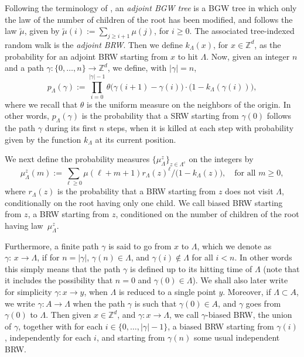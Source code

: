 \documentclass[11pt]{article}
\numberwithin{equation}{section}
\theoremstyle{plain}
\theoremstyle{definition}
\newcommand{\1}{{\text{\Large $\mathfrak 1$}}}
\begin{document}
Following the terminology of \cite{Zhu1,Zhu3}, an
{\it adjoint BGW tree} is a BGW tree in which only the law
of the number of children of
the root has been modified, and follows the law $\tilde \mu$, given by $\tilde \mu(i) := \sum_{j\ge i+1} \mu(j)$, for $i\ge 0$. The associated
tree-indexed random walk is the {\it adjoint BRW}.
Then we define $k_\Lambda(x)$, for $x\in \mathbb Z^d$, as the probability for an adjoint BRW starting from $x$ to hit $\Lambda$.
Now, given an integer $n$ and
a path $\gamma:\{0,\dots,n\} \to \mathbb Z^d$,
we define, with $|\gamma|= n$,
\begin{equation}\label{def.pLambda}
p_\Lambda(\gamma):= \prod_{i=0}^{|\gamma|-1}\theta\big(\gamma(i+1)-\gamma(i)\big) \cdot \big(1- k_\Lambda(\gamma(i))\big),
\end{equation}
where we recall that $\theta$ is the uniform measure on the neighbors of the origin.
In other words, $p_\Lambda(\gamma)$ is the probability that a SRW starting from $\gamma(0)$ follows the path $\gamma$ during its first $n$ steps,
when it is killed at each step with probability given by the function $k_\Lambda$ at its current position.

We next define the probability measures $\{\mu_\Lambda^z\}_{z\in \Lambda^c}$ on the integers by
\begin{equation*}
\mu_\Lambda^z(m) :=
\sum_{\ell \ge 0} \mu(\ell + m +1) r_\Lambda(z)^\ell / \big(1-k_\Lambda(z)\big), \quad \text{for all }m\ge 0,
\end{equation*}
where $r_\Lambda(z)$ is the probability that a BRW starting from $z$ does not visit $\Lambda$, conditionally on the root having only one child.
We call biased BRW starting from $z$, a BRW starting from $z$, conditioned on the number of children of the root having law~$\mu_\Lambda^z$.

Furthermore, a finite path $\gamma$
is said to go from $x$ to $\Lambda$,
which we denote as \hbox{$\gamma{:}\,x\!\to\! \Lambda$},
if for $n=|\gamma|$, $\gamma(n)\in \Lambda$,
and $\gamma(i)\notin \Lambda$ for all $i<n$.
In other words this simply means that the path $\gamma$ is defined up
to its hitting time of $\Lambda$
(note that it includes the possibility that $n=0$ and $\gamma(0) \in \Lambda$). We shall also later
write for simplicity $\gamma:x\to y$, when $\Lambda$ is reduced to a single point $y$. Moreover, if $\Lambda\subset A$, we write $\gamma:A\to \Lambda$ when the path $\gamma$ is such that $\gamma(0)\in A$, and $\gamma$ goes from $\gamma(0)$ to $\Lambda$.
Then given $x\in \mathbb Z^d$, and $\gamma:x\to \Lambda$,
we call $\gamma$-biased BRW, the union of $\gamma$, together with for each $i\in \{0,\dots,|\gamma|-1\}$,
a biased BRW starting from $\gamma(i)$, independently for each $i$, and starting from $\gamma(n)$ some usual independent BRW.
\end{document}
